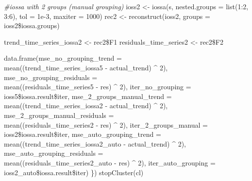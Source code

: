 \documentclass[specialist,
               substylefile = spbu_report.rtx,
               subf,href,colorlinks=true, 12pt]{disser}
\theoremstyle{definition}
\newenvironment{Shaded}{\begin{snugshade}}{\end{snugshade}}
\newcommand{\AttributeTok}[1]{\textcolor[rgb]{0.77,0.63,0.00}{#1}}
\newcommand{\CommentTok}[1]{\textcolor[rgb]{0.56,0.35,0.01}{\textit{#1}}}
\newcommand{\DecValTok}[1]{\textcolor[rgb]{0.00,0.00,0.81}{#1}}
\newcommand{\FloatTok}[1]{\textcolor[rgb]{0.00,0.00,0.81}{#1}}
\newcommand{\FunctionTok}[1]{\textcolor[rgb]{0.00,0.00,0.00}{#1}}
\newcommand{\NormalTok}[1]{#1}
\newcommand{\OtherTok}[1]{\textcolor[rgb]{0.56,0.35,0.01}{#1}}
\newcommand{\SpecialCharTok}[1]{\textcolor[rgb]{0.00,0.00,0.00}{#1}}
\begin{document}
\begin{Shaded}
\begin{Highlighting}[]
    \CommentTok{\#iossa with 2 groups (manual grouping)}
\NormalTok{    ioss2 }\OtherTok{\textless{}{-}} \FunctionTok{iossa}\NormalTok{(s, }\AttributeTok{nested.groups =} \FunctionTok{list}\NormalTok{(}\DecValTok{1}\SpecialCharTok{:}\DecValTok{2}\NormalTok{, }\DecValTok{3}\SpecialCharTok{:}\DecValTok{6}\NormalTok{), }\AttributeTok{tol =} \FloatTok{1e{-}3}\NormalTok{, }\AttributeTok{maxiter =} \DecValTok{1000}\NormalTok{)}
\NormalTok{    rec2 }\OtherTok{\textless{}{-}} \FunctionTok{reconstruct}\NormalTok{(ioss2, }\AttributeTok{groups =}\NormalTok{ ioss2}\SpecialCharTok{\$}\NormalTok{iossa.groups)}
    
\NormalTok{    trend\_time\_series\_iossa2 }\OtherTok{\textless{}{-}}\NormalTok{ rec2}\SpecialCharTok{\$}\NormalTok{F1}
\NormalTok{    residuals\_time\_series2 }\OtherTok{\textless{}{-}}\NormalTok{ rec2}\SpecialCharTok{\$}\NormalTok{F2}
    
    \FunctionTok{data.frame}\NormalTok{(}\AttributeTok{mse\_no\_grouping\_trend =} 
    \\ \FunctionTok{mean}\NormalTok{((trend\_time\_series\_iossa5 }\SpecialCharTok{{-}}\NormalTok{ actual\_trend) }\SpecialCharTok{\^{}} \DecValTok{2}\NormalTok{),}
               \AttributeTok{mse\_no\_grouping\_residuals =}
               \\ \FunctionTok{mean}\NormalTok{((residuals\_time\_series5 }\SpecialCharTok{{-}}\NormalTok{ res) }\SpecialCharTok{\^{}} \DecValTok{2}\NormalTok{),}
               \AttributeTok{iter\_no\_grouping =}\NormalTok{ ioss5}\SpecialCharTok{\$}\NormalTok{iossa.result}\SpecialCharTok{\$}\NormalTok{iter,}
               \AttributeTok{mse\_2\_groups\_manual\_trend =}
               \\ \FunctionTok{mean}\NormalTok{((trend\_time\_series\_iossa2 }\SpecialCharTok{{-}}\NormalTok{ actual\_trend) }\SpecialCharTok{\^{}} \DecValTok{2}\NormalTok{),}
               \AttributeTok{mse\_2\_groups\_manual\_residuals =}
               \\ \FunctionTok{mean}\NormalTok{((residuals\_time\_series2 }\SpecialCharTok{{-}}\NormalTok{ res) }\SpecialCharTok{\^{}} \DecValTok{2}\NormalTok{),}
               \AttributeTok{iter\_2\_groups\_manual =}\NormalTok{ ioss2}\SpecialCharTok{\$}\NormalTok{iossa.result}\SpecialCharTok{\$}\NormalTok{iter,}
               \AttributeTok{mse\_auto\_grouping\_trend =}
               \\ \FunctionTok{mean}\NormalTok{((trend\_time\_series\_iossa2\_auto }\SpecialCharTok{{-}}\NormalTok{ actual\_trend) }\SpecialCharTok{\^{}} \DecValTok{2}\NormalTok{),}
               \AttributeTok{mse\_auto\_grouping\_residuals =}
               \\ \FunctionTok{mean}\NormalTok{((residuals\_time\_series2\_auto }\SpecialCharTok{{-}}\NormalTok{ res) }\SpecialCharTok{\^{}} \DecValTok{2}\NormalTok{),}
               \AttributeTok{iter\_auto\_grouping =}\NormalTok{ ioss2\_auto}\SpecialCharTok{\$}\NormalTok{iossa.result}\SpecialCharTok{\$}\NormalTok{iter)}
\NormalTok{  \})}
  \FunctionTok{stopCluster}\NormalTok{(cl)}
  

\end{Highlighting}
\end{Shaded}
\end{document}
